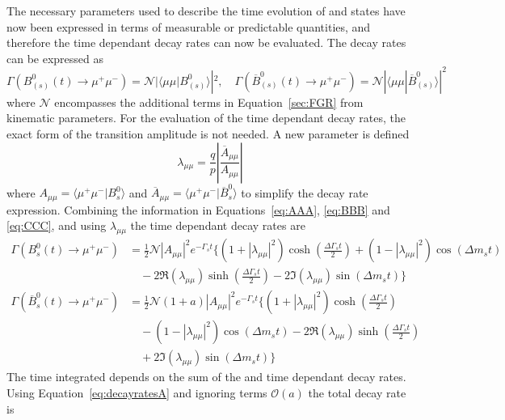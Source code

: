 The necessary parameters used to describe the time evolution of \bsd and \barbsd states have now been expressed in terms of measurable or predictable quantities, and therefore the time dependant decay rates can now be evaluated. The decay rates can be expressed as
\begin{equation}
\Gamma (B^0_{(s)}(t) \to \mu^+ \mu^-) = \mathcal{N}|\langle \mu \mu | B^0_{(s)} \rangle|^2, \quad
\Gamma (\overline{B}^0_{(s)}(t) \to \mu^+ \mu^-) =\mathcal{N}|\langle \mu\mu | \overline{B}^0_{(s)} \rangle|^2
\label{eq:CCC}
\end{equation}
where $\mathcal{N}$ encompasses the additional terms in Equation~\ref{sec:FGR} from kinematic parameters. For the evaluation of the time dependant decay rates, the exact form of the transition amplitude is not needed. A new parameter is defined
\begin{equation}
\lambda_{\mu\mu} = \frac{q}{p} \left| \frac{\overline{A}_{\mu\mu}}{A_{\mu\mu}}\right|
\end{equation}
where $A_{\mu\mu} = \langle \mu^+\mu^- | B^0_s \rangle$ and $\overline{A}_{\mu\mu} = \langle \mu^+\mu^- |\overline{B}^0_s \rangle$ to simplify the decay rate expression. Combining the information in Equations~\ref{eq:AAA}, \ref{eq:BBB} and \ref{eq:CCC}, and using $\lambda_{\mu\mu}$ the time dependant decay rates are
\begin{align}
\Gamma(B^0_s(t) \to \mu^+ \mu^-) &=  \frac{1}{2} \mathcal{N} |A_{\mu\mu}|^2 e^{- \Gamma_s t} \bigg\{ (1 + |\lambda_{\mu\mu}|^2) \cosh \left( \frac{\Delta \Gamma_s t}{2} \right) + ( 1 - |\lambda_{\mu\mu}|^2) \cos(\Delta m_s t) \nonumber \\
& \quad {}- 2\mathrm{\Re}(\lambda_{\mu\mu})\sinh \left(\frac{\Delta \Gamma_s t}{2}\right) - 2\mathrm{\Im}(\lambda_{\mu\mu})\sin(\Delta m_s t) \bigg\} \label{eq:decayratesApart}\\
\Gamma(\overline{B}^0_s(t) \to \mu^+ \mu^-) &=  \frac{1}{2} \mathcal{N} (1 + a)|A_{\mu\mu}|^2 e^{- \Gamma_s t} \bigg\{ (1 + |\lambda_{\mu\mu}|^2) \cosh \left( \frac{\Delta \Gamma_s t}{2} \right) \nonumber \\
& \quad {}- ( 1 - |\lambda_{\mu\mu}|^2) \cos(\Delta m_s t) -2\mathrm{\Re}(\lambda_{\mu\mu})\sinh \left(\frac{\Delta \Gamma_s t}{2}\right) \nonumber\\ 
& \quad {}+ 2\mathrm{\Im}(\lambda_{\mu\mu})\sin(\Delta m_s t) \bigg\} \label{eq:decayratesA}
\end{align}
The time integrated \BF depends on the sum of the \bsd and \barbsd time dependant decay rates. Using Equation~\ref{eq:decayratesA} and ignoring terms $\mathcal{O}(a)$ the total decay rate is
